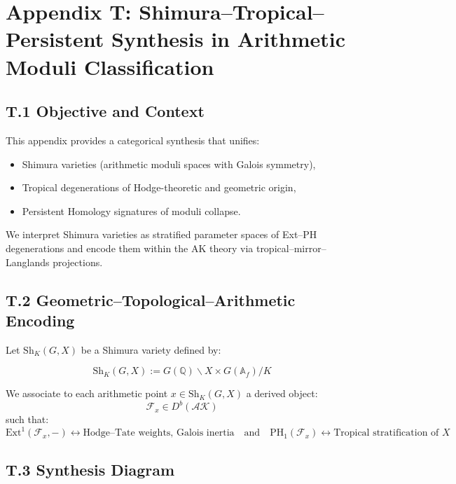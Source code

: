 \documentclass[11pt]{article}
\begin{document}

\section*{Appendix T: Shimura–Tropical–Persistent Synthesis in Arithmetic Moduli Classification}

\subsection*{T.1 Objective and Context}

This appendix provides a categorical synthesis that unifies:

\begin{itemize}
  \item Shimura varieties (arithmetic moduli spaces with Galois symmetry),
  \item Tropical degenerations of Hodge-theoretic and geometric origin,
  \item Persistent Homology signatures of moduli collapse.
\end{itemize}

We interpret Shimura varieties as stratified parameter spaces of Ext–PH degenerations  
and encode them within the AK theory via tropical–mirror–Langlands projections.

\subsection*{T.2 Geometric–Topological–Arithmetic Encoding}

Let \( \mathrm{Sh}_K(G,X) \) be a Shimura variety defined by:

\[
\mathrm{Sh}_K(G,X) := G(\mathbb{Q}) \backslash X \times G(\mathbb{A}_f) / K
\]

We associate to each arithmetic point \( x \in \mathrm{Sh}_K(G,X) \) a derived object:
\[
\mathcal{F}_x \in D^b(\mathcal{AK})
\]
such that:
\[
\mathrm{Ext}^1(\mathcal{F}_x, -) \longleftrightarrow \text{Hodge–Tate weights, Galois inertia}
\quad \text{and} \quad
\mathrm{PH}_1(\mathcal{F}_x) \longleftrightarrow \text{Tropical stratification of } X
\]

\subsection*{T.3 Synthesis Diagram}
\end{document}
